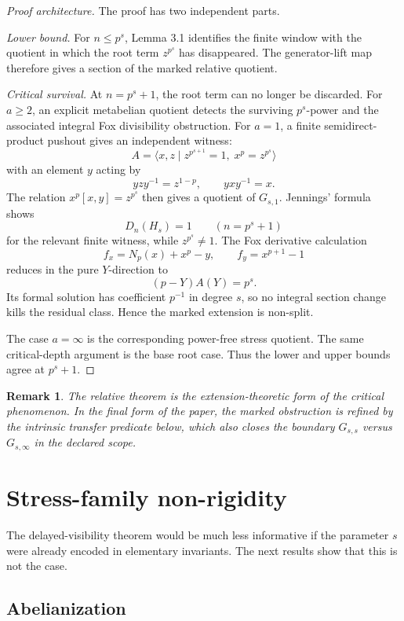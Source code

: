 \documentclass[11pt]{article}
\newtheorem{remark}[theorem]{Remark}
\newcommand{\Dn}{D_n}
\begin{document}
\begin{proof}[Proof architecture]
The proof has two independent parts.

\emph{Lower bound.}
For \(n\le p^s\), Lemma 3.1 identifies the finite window with the
quotient in which the root term \(z^{p^s}\) has disappeared.  The
generator-lift map therefore gives a section of the marked relative
quotient.

\emph{Critical survival.}
At \(n=p^s+1\), the root term can no longer be discarded.  For
\(a\ge2\), an explicit metabelian quotient detects the surviving
\(p^s\)-power and the associated integral Fox divisibility obstruction.
For \(a=1\), a finite semidirect-product pushout gives an independent
witness:
\[
A=\langle x,z\mid z^{p^{s+1}}=1,\;x^p=z^{p^s}\rangle
\]
with an element $y$ acting by
\[
yzy^{-1}=z^{1-p},
\qquad
yxy^{-1}=x.
\]
The relation \(x^p[x,y]=z^{p^s}\) then gives a quotient of
\(G_{s,1}\).  Jennings' formula shows
\[
\Dn(H_s)=1
\qquad(n=p^s+1)
\]
for the relevant finite witness, while \(z^{p^s}\ne1\).  The Fox
derivative calculation
\[
f_x=N_p(x)+x^p-y,\qquad f_y=x^{p+1}-1
\]
reduces in the pure $Y$-direction to
\[
(p-Y)A(Y)=p^s.
\]
Its formal solution has coefficient \(p^{-1}\) in degree $s$, so no
integral section change kills the residual class.  Hence the marked
extension is non-split.

The case \(a=\infty\) is the corresponding power-free stress quotient.
The same critical-depth argument is the base root case.  Thus the
lower and upper bounds agree at \(p^s+1\).
\end{proof}

\begin{remark}
The relative theorem is the extension-theoretic form of the critical
phenomenon.  In the final form of the paper, the marked obstruction is
refined by the intrinsic transfer predicate below, which also closes
the boundary $G_{s,s}$ versus $G_{s,\infty}$ in the declared scope.
\end{remark}

\section{Stress-family non-rigidity}

The delayed-visibility theorem would be much less informative if the
parameter $s$ were already encoded in elementary invariants.  The next
results show that this is not the case.

\subsection{Abelianization}
\end{document}
